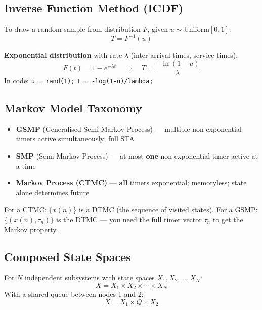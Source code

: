 \documentclass[10pt,a4paper]{article}
\begin{document}
\subsection*{Inverse Function Method (ICDF)}

To draw a random sample from distribution $F$, given $u \sim \text{Uniform}[0,1]$:
\[
  T = F^{-1}(u)
\]

\begin{keybox}
\textbf{Exponential distribution} with rate $\lambda$ (inter-arrival times, service times):
\[
  F(t) = 1 - e^{-\lambda t}
  \quad\Rightarrow\quad
  T = \frac{-\ln(1-u)}{\lambda}
\]
In code: \quad \texttt{u = rand(1);} \quad \texttt{T = -log(1-u)/lambda;}
\end{keybox}

\subsection*{Markov Model Taxonomy}

\begin{defbox}
\begin{itemize}
  \item \textbf{GSMP} (Generalised Semi-Markov Process) --- multiple non-exponential timers active simultaneously; full STA
  \item \textbf{SMP} (Semi-Markov Process) --- at most \textbf{one} non-exponential timer active at a time
  \item \textbf{Markov Process (CTMC)} --- \textbf{all} timers exponential; memoryless; state alone determines future
\end{itemize}
\end{defbox}

\begin{notebox}
For a CTMC: $\{x(n)\}$ is a DTMC (the sequence of visited states). For a GSMP: $\{(x(n),\tau_n)\}$ is the DTMC --- you need the full timer vector $\tau_n$ to get the Markov property.
\end{notebox}

\subsection*{Composed State Spaces}

For $N$ independent subsystems with state spaces $X_1, X_2, \ldots, X_N$:
\[
  X = X_1 \times X_2 \times \cdots \times X_N
\]
With a shared queue between nodes 1 and 2:
\[
  X = X_1 \times Q \times X_2
\]

\clearpage
\end{document}
